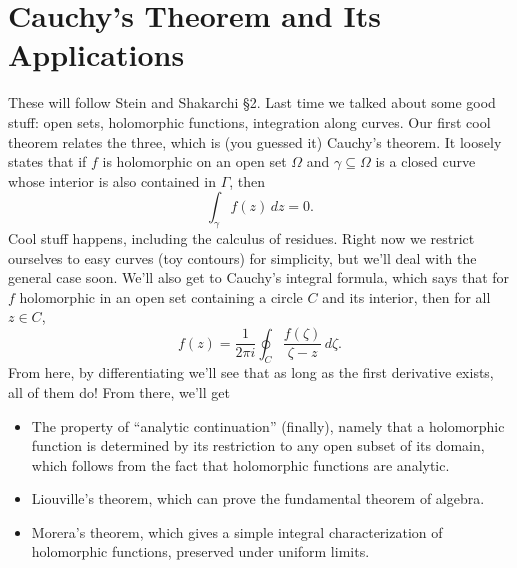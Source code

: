 \section{Cauchy's Theorem and Its Applications}
These will follow Stein and Shakarchi \S 2.
\orbreak
Last time we talked about some good stuff: open sets, holomorphic functions, integration along curves. Our first cool theorem relates the three, which is (you guessed it) Cauchy's theorem. It loosely states that if $f$ is holomorphic on an open set $\Omega$ and $\gamma\subseteq \Omega$ is a closed curve whose interior is also contained in $\Gamma$, then \[
    \int_{\gamma}^{} f(z) \, dz=0.
\] Cool stuff happens, including the calculus of residues. Right now we restrict ourselves to easy curves (toy contours) for simplicity, but we'll deal with the general case soon. We'll also get to Cauchy's integral formula, which says that for $f$ holomorphic in an open set containing a circle $C$ and its interior, then for all $z\in C$, \[
f(z)=\frac{1}{2\pi i}\oint_{C}^{} \frac{f(\zeta)}{\zeta-z} \, d\zeta.
\] From here, by differentiating we'll see that as long as the first derivative exists, all of them do! From there, we'll get
\begin{itemize}
    \item The property of ``analytic continuation'' (finally), namely that a holomorphic function is determined by its restriction to any open subset of its domain, which follows from the fact that holomorphic functions are analytic.
    \item Liouville's theorem, which can prove the fundamental theorem of algebra.
    \item Morera's theorem, which gives a simple integral characterization of holomorphic functions, preserved under uniform limits.
\end{itemize}
